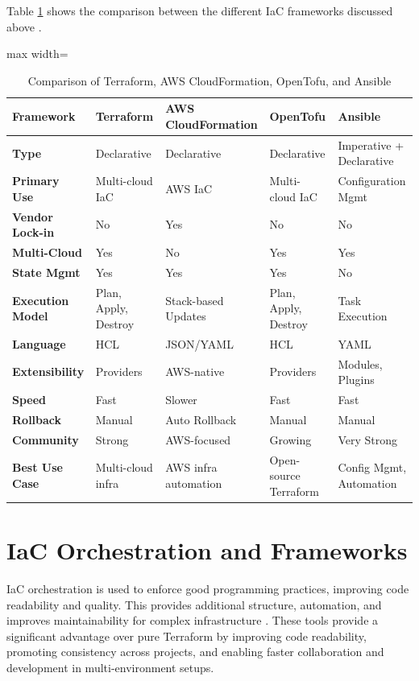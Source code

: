 Table \ref{tab:comparison} shows the comparison between the different IaC frameworks discussed above \cite{spitzenberger-2024} \cite{ninawe-2025} \cite{dinu-2024}.
\begin{table}[h]
    \centering
    \small %
    \renewcommand{\arraystretch}{1.3}
    \begin{adjustbox}{max width=\textwidth} %
    \begin{tabular}{p{3cm} p{3cm} p{3cm} p{3cm} p{3cm}}
        \toprule
        \textbf{Framework} & \textbf{Terraform} & \textbf{AWS CloudFormation} & \textbf{OpenTofu} & \textbf{Ansible} \\
        \midrule
        \textbf{Type} & Declarative & Declarative & Declarative & Imperative + Declarative \\
        \textbf{Primary Use} & Multi-cloud IaC & AWS IaC & Multi-cloud IaC & Configuration Mgmt \\
        \textbf{Vendor Lock-in} & No & Yes & No & No \\
        \textbf{Multi-Cloud} & Yes & No & Yes & Yes \\
        \textbf{State Mgmt} & Yes & Yes & Yes & No \\
        \textbf{Execution Model} & Plan, Apply, Destroy & Stack-based Updates & Plan, Apply, Destroy & Task Execution \\
        \textbf{Language} & HCL & JSON/YAML & HCL & YAML \\
        \textbf{Extensibility} & Providers & AWS-native & Providers & Modules, Plugins \\
        \textbf{Speed} & Fast & Slower & Fast & Fast \\
        \textbf{Rollback} & Manual& Auto Rollback & Manual & Manual \\
        \textbf{Community} & Strong & AWS-focused & Growing & Very Strong \\
        \textbf{Best Use Case} & Multi-cloud infra & AWS infra automation & Open-source Terraform & Config Mgmt, Automation \\
        \bottomrule
    \end{tabular}
    \end{adjustbox}
    \caption{Comparison of Terraform, AWS CloudFormation, OpenTofu, and Ansible}
    \label{tab:comparison}
\end{table}

\newpage

\section{IaC Orchestration and Frameworks}
IaC orchestration is used to enforce good programming practices, improving code readability and quality. This provides additional structure, automation, and improves maintainability for complex infrastructure \cite{spacelift-2025}. These tools provide a significant advantage over pure Terraform by improving code readability, promoting consistency across projects, and enabling faster collaboration and development in multi-environment setups. 

